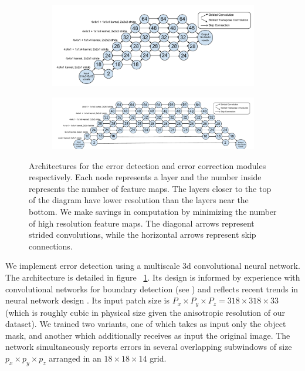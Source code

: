 \documentclass{article}
\begin{document}
\begin{figure}
\begin{subfigure}{0.5\textwidth}
	\centering
	\includegraphics[width=1.0\linewidth]{error_detector.pdf}
\end{subfigure}
\begin{subfigure}{0.5\textwidth}
	\centering
	\includegraphics[width=1.0\linewidth]{error_corrector.pdf}
\end{subfigure}
\caption{Architectures for the error detection and error correction modules respectively. Each node represents a layer and the number inside represents the number of feature maps. The layers closer to the top of the diagram have lower resolution than the layers near the bottom. We make savings in computation by minimizing the number of high resolution feature maps. The diagonal arrows represent strided convolutions, while the horizontal arrows represent skip connections.}
\label{fig:architecture}
\end{figure}

We implement error detection using a multiscale 3d convolutional neural network. The architecture is detailed in figure ~\ref{fig:architecture}. Its design is informed by experience with convolutional networks for boundary detection (see \cite{kisuk}) and reflects recent trends in neural network design \cite{unet,resnet}. Its input patch size is $P_x\times P_y\times P_z=318\times 318\times 33$ (which is roughly cubic in physical size given the anisotropic resolution of our dataset). We trained two variants, one of which takes as input only the object mask, and another which additionally receives as input the original image. The network simultaneously reports errors in several overlapping subwindows of size $p_x\times p_y \times p_z$ arranged in an $18\times 18\times 14$ grid.
\end{document}
